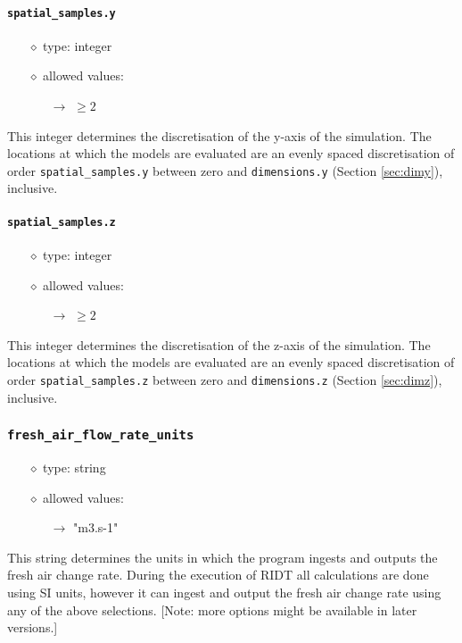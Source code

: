 \documentclass[]{article}
\def\code#1{\texttt{#1}}
\begin{document}
\paragraph{\code{spatial\_samples.y}}
\begin{itemize}
    \item[$\diamond$] type: integer 
    \item[$\diamond$] allowed values:
    \begin{itemize}
        \item[$\rightarrow$] $\geq2$
    \end{itemize}
\end{itemize}
This integer determines the discretisation of the y-axis of the simulation. The
locations at which the models are evaluated are an evenly spaced discretisation
of order \code{spatial\_samples.y} between zero and \code{dimensions.y} (Section
\ref{sec:dimy}), inclusive.

\paragraph{\code{spatial\_samples.z}}
\begin{itemize}
    \item[$\diamond$] type: integer 
    \item[$\diamond$] allowed values:
    \begin{itemize}
        \item[$\rightarrow$] $\geq2$
    \end{itemize}
\end{itemize}
This integer determines the discretisation of the z-axis of the simulation. The
locations at which the models are evaluated are an evenly spaced discretisation
of order \code{spatial\_samples.z} between zero and \code{dimensions.z} (Section
\ref{sec:dimz}), inclusive.

\subsubsection{\code{fresh\_air\_flow\_rate\_units}}\label{sec:freshairchangerateunits}
\begin{itemize}
    \item[$\diamond$] type: string 
    \item[$\diamond$] allowed values:
    \begin{itemize}
        \item[$\rightarrow$] "m3.s-1"
    \end{itemize}
\end{itemize}
This string determines the units in which the program ingests and outputs the
fresh air change rate. During the execution of RIDT all calculations are done
using SI units, however it can ingest and output the fresh air change rate using
any of the above selections. [Note: more options might be available in later
versions.]
\end{document}
